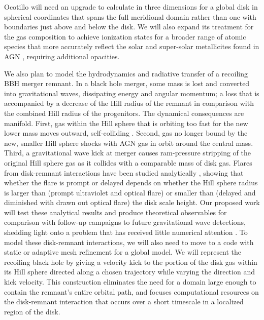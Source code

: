 Ocotillo will need an upgrade to calculate in three dimensions for a global disk in spherical coordinates that spans the full meridional domain rather than one with boundaries just above and below the disk.
We will also expand its treatment for the gas composition to achieve ionization states for a broader range of atomic species that more accurately reflect the solar and super-solar metallicites found in AGN \citep{HuangLinShields23}, requiring additional opacities.


We also plan to model the hydrodynamics and radiative transfer of a recoiling BBH merger remnant.
In a black hole merger, some mass is lost and converted into gravitational waves, dissipating energy and angular momentum; a loss that is accompanied by a decrease of the Hill radius of the remnant in comparison with the combined Hill radius of the progenitors.
The dynamical consequences are manifold.
First, gas within the Hill sphere that is orbiting too fast for the new lower mass moves outward, self-colliding \citep{McKernan+19}.
Second, gas no longer bound by the new, smaller Hill sphere shocks with AGN gas in orbit around the central mass.
Third, a gravitational wave kick at merger causes ram-pressure stripping of the original Hill sphere gas as it collides with a comparable mass of disk gas.
Flares from disk-remnant interactions have been studied analytically \citep{McKernan+19}, showing that whether the flare is prompt or delayed depends on whether the Hill sphere radius is larger than (prompt ultraviolet and optical flare) or smaller than (delayed and diminished with drawn out optical flare) the disk scale height.
Our proposed work will test these analytical results and produce theoretical observables for comparison with follow-up campaigns to future gravitational wave detections, shedding light onto a problem that has received little numerical attention \citep{Corrales+10}.
To model these disk-remnant interactions, we will also need to move to a code with static or adaptive mesh refinement for a global model.
We will represent the recoiling black hole by giving a velocity kick to the portion of
the disk gas within its Hill sphere directed along a chosen trajectory while varying the direction and kick velocity.
This construction eliminates the need for a domain large enough to contain the remnant’s
entire orbital path, and focuses computational resources on the disk-remnant interaction that occurs
over a short timescale in a localized region of the disk.

